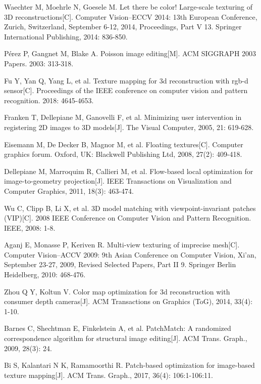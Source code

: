 Waechter M, Moehrle N, Goesele M. Let there be color! Large-scale texturing of 3D reconstructions[C]. Computer Vision–ECCV 2014: 13th European Conference, Zurich, Switzerland, September 6-12, 2014, Proceedings, Part V 13. Springer International Publishing, 2014: 836-850.


Pérez P, Gangnet M, Blake A. Poisson image editing[M]. ACM SIGGRAPH 2003 Papers. 2003: 313-318.

Fu Y, Yan Q, Yang L, et al. Texture mapping for 3d reconstruction with rgb-d sensor[C]. Proceedings of the IEEE conference on computer vision and pattern recognition. 2018: 4645-4653.

Franken T, Dellepiane M, Ganovelli F, et al. Minimizing user intervention in registering 2D images to 3D models[J]. The Visual Computer, 2005, 21: 619-628.

Eisemann M, De Decker B, Magnor M, et al. Floating textures[C]. Computer graphics forum. Oxford, UK: Blackwell Publishing Ltd, 2008, 27(2): 409-418.

Dellepiane M, Marroquim R, Callieri M, et al. Flow-based local optimization for image-to-geometry projection[J]. IEEE Transactions on Visualization and Computer Graphics, 2011, 18(3): 463-474.

Wu C, Clipp B, Li X, et al. 3D model matching with viewpoint-invariant patches (VIP)[C]. 2008 IEEE Conference on Computer Vision and Pattern Recognition. IEEE, 2008: 1-8.

Aganj E, Monasse P, Keriven R. Multi-view texturing of imprecise mesh[C]. Computer Vision–ACCV 2009: 9th Asian Conference on Computer Vision, Xi’an, September 23-27, 2009, Revised Selected Papers, Part II 9. Springer Berlin Heidelberg, 2010: 468-476.

Zhou Q Y, Koltun V. Color map optimization for 3d reconstruction with consumer depth cameras[J]. ACM Transactions on Graphics (ToG), 2014, 33(4): 1-10.

Barnes C, Shechtman E, Finkelstein A, et al. PatchMatch: A randomized correspondence algorithm for structural image editing[J]. ACM Trans. Graph., 2009, 28(3): 24.

Bi S, Kalantari N K, Ramamoorthi R. Patch-based optimization for image-based texture mapping[J]. ACM Trans. Graph., 2017, 36(4): 106:1-106:11.

